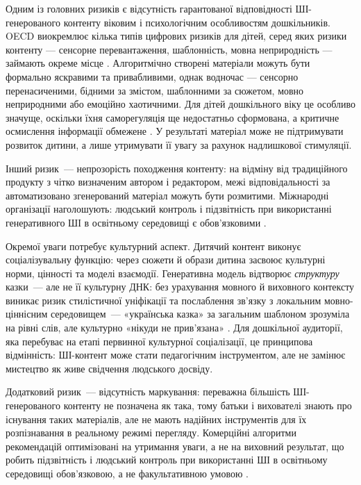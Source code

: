 \documentclass[14pt, a4paper]{extreport}
\begin{document}
Одним із головних ризиків є відсутність гарантованої відповідності ШІ-генерованого контенту віковим і психологічним особливостям дошкільників. OECD виокремлює кілька типів цифрових ризиків для дітей, серед яких ризики контенту --- сенсорне перевантаження, шаблонність, мовна неприродність --- займають окреме місце \cite{OECD2021}. Алгоритмічно створені матеріали можуть бути формально яскравими та привабливими, однак водночас --- сенсорно перенасиченими, бідними за змістом, шаблонними за сюжетом, мовно неприродними або емоційно хаотичними. Для дітей дошкільного віку це особливо значуще, оскільки їхня саморегуляція ще недостатньо сформована, а критичне осмислення інформації обмежене \cite{PavelkivTsyhypalo2006,DutkevychDoshkilna2007,Radesky2023,OECD2025}. У результаті матеріал може не підтримувати розвиток дитини, а лише утримувати її увагу за рахунок надлишкової стимуляції.

Інший ризик~--- непрозорість походження контенту: на відміну від традиційного продукту з чітко визначеним автором і редактором, межі відповідальності за автоматизовано згенерований матеріал можуть бути розмитими. Міжнародні організації наголошують: людський контроль і підзвітність при використанні генеративного ШІ в освітньому середовищі є обов'язковими \cite{UNESCO2023,UNICEFAI2021,UNCRC25}.

Окремої уваги потребує культурний аспект. Дитячий контент виконує соціалізувальну функцію: через сюжети й образи дитина засвоює культурні норми, цінності та моделі взаємодії. Генеративна модель відтворює \textit{структуру} казки~--- але не її культурну ДНК: без урахування мовного й виховного контексту виникає ризик стилістичної уніфікації та послаблення зв'язку з локальним мовно-ціннісним середовищем~--- «українська казка» за загальним шаблоном зрозуміла на рівні слів, але культурно «нікуди не прив'язана» \cite{OECD2023,OECD2025,UNESCO2023}. Для дошкільної аудиторії, яка перебуває на етапі первинної культурної соціалізації, це принципова відмінність: ШІ-контент може стати педагогічним інструментом, але не замінює мистецтво як живе свідчення людського досвіду.

Додатковий ризик~--- відсутність маркування: переважна більшість ШІ-генерованого контенту не позначена як така, тому батьки і вихователі знають про існування таких матеріалів, але не мають надійних інструментів для їх розпізнавання в реальному режимі перегляду. Комерційні алгоритми рекомендацій оптимізовані на утримання уваги, а не на виховний результат, що робить підзвітність і людський контроль при використанні ШІ в освітньому середовищі обов'язковою, а не факультативною умовою \cite{UNICEFAI2021,UNCRC25}.
\end{document}
